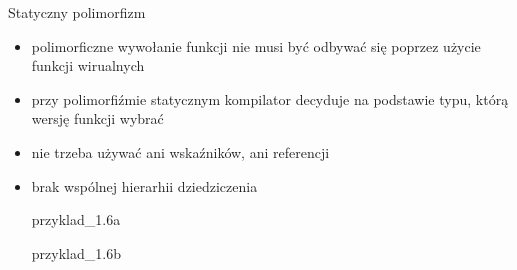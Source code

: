 \documentclass[11pt]{beamer}
\begin{document}
\begin{frame}[fragile]{Statyczny polimorfizm}
	\begin{itemize}
		\item polimorficzne wywołanie funkcji nie musi być odbywać się poprzez użycie funkcji wirualnych
		\item przy polimorfiźmie statycznym kompilator decyduje na podstawie typu, którą wersję funkcji wybrać
		\item nie trzeba używać ani wskaźników, ani referencji
		\item brak wspólnej hierarhii dziedziczenia
		
		\alert{przyklad\_1.6a}
		
		\alert{przyklad\_1.6b}
	\end{itemize}

\end{frame}
\end{document}
